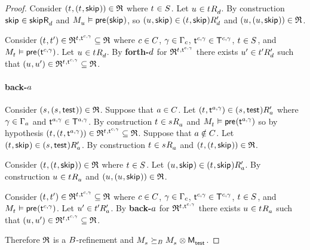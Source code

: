 \begin{proof}
Consider $(\kStateT, (\kStateT, \aStateSkip)) \in \refinement$ where $\kStateT \in \kStates$.
Let $\kStateU \in \kSuccessorsD{\kStateT}$.
By construction $\aStateSkip \in \aSuccessorsD{\aStateSkip}$ and $\kPModel{\kStateU} \entails \aPrecondition(\aStateSkip)$, so $(\kStateU, \aStateSkip) \in \kSuccessorsPD{(\kStateT, \aStateSkip)}$ and $(\kStateU, (\kStateU, \aStateSkip)) \in \refinement$.

Consider $(\kStateT, \kStateTP) \in \refinement^{\kStateT, \aStateT[\agentC, \gamma]} \subseteq \refinement$ where $\agentC \in \agentsC$, $\gamma \in \Gamma_\agentC$, $\aStateT[\agentC, \gamma] \in \aStatesT[\agentC, \gamma]$, $\kStateT \in \kStates$, and $\kPModel{\kStateT} \entails \aPrecondition(\aStateT[\agentC, \gamma])$.
Let $\kStateU \in \kSuccessorsD{\kStateT}$.
By {\bf forth-$\agentD$} for $\refinement^{\kStateT, \aStateT[\agentC, \gamma]}$ there exists $\kStateUP \in \kSuccessorsPD{\kStateTP}$ such that $(\kStateU, \kStateUP) \in \refinement^{\kStateT, \aStateT[\agentC, \gamma]} \subseteq \refinement$.

\paragraph{back-$\agentA$}
Consider $(\kStateS, (\kStateS, \aStateTest)) \in \refinement$.
Suppose that $\agentA \in \agentsC$.
Let $(\kStateT, \aStateT[\agentA, \gamma]) \in \kSuccessorsPA{(\kStateS, \aStateTest)}$ where $\gamma \in \Gamma_\agentA$ and $\aStateT[\agentA, \gamma] \in \aStatesT[\agentA, \gamma]$.
By construction $\kStateT \in \kSuccessorsA{\kStateS}$ and $\kPModel{\kStateT} \entails \aPrecondition(\aStateT[\agentA, \gamma])$ so by hypothesis $(\kStateT, (\kStateT, \aStateT[\agentA, \gamma])) \in \refinement^{\kStateT, \aStateT[\agentC, \gamma]} \subseteq \refinement$.
Suppose that $\agentA \notin \agentsC$.
Let $(\kStateT, \aStateSkip) \in \kSuccessorsPA{(\kStateS, \aStateTest)}$.
By construction $\kStateT \in \kSuccessorsA{\kStateS}$ and $(\kStateT, (\kStateT, \aStateSkip)) \in \refinement$.

Consider $(\kStateT, (\kStateT, \aStateSkip)) \in \refinement$ where $\kStateT \in \kStates$.
Let $(\kStateU, \aStateSkip) \in \kSuccessorsPA{(\kStateT, \aStateSkip)}$.
By construction $\kStateU \in \kSuccessorsA{\kStateT}$ and $(\kStateU, (\kStateU, \aStateSkip)) \in \refinement$.

Consider $(\kStateT, \kStateTP) \in \refinement^{\kStateT, \aStateT[\agentC, \gamma]} \subseteq \refinement$ where $\agentC \in \agentsC$, $\gamma \in \Gamma_\agentC$, $\aStateT[\agentC, \gamma] \in \aStatesT[\agentC, \gamma]$, $\kStateT \in \kStates$, and $\kPModel{\kStateT} \entails \aPrecondition(\aStateT[\agentC, \gamma])$.
Let $\kStateUP \in \kSuccessorsPA{\kStateTP}$.
By {\bf back-$\agentA$} for $\refinement^{\kStateT, \aStateT[\agentC, \gamma]}$ there exists $\kStateU \in \kSuccessorsA{\kStateT}$ such that $(\kStateU, \kStateUP) \in \refinement^{\kStateT, \aStateT[\agentC, \gamma]} \subseteq \refinement$.

Therefore $\refinement$ is a $\agentsB$-refinement and $\kPModel{\kStateS} \simulatesBs \kPModel{\kStateS} \exec \aPModel{\aStateTest}$.
\end{proof}


